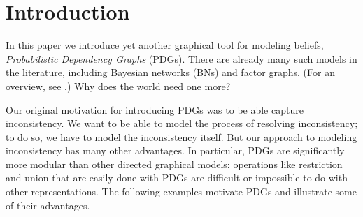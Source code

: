 \documentclass[letterpaper]{article} %
\theoremstyle{plain}
\theoremstyle{definition}
\theoremstyle{remark}
\begin{document}
\section{Introduction}

In this paper we introduce yet another graphical
tool
for modeling beliefs,
\emph{Probabilistic Dependency Graphs} (PDGs). There are already many
such models in the literature, including Bayesian networks (BNs) and
factor graphs. (For an overview, see 
\cite{KF09}.)
Why does the world need one more?  

Our original motivation for introducing PDGs was to be able capture
inconsistency. We want to be able to model the process of resolving
inconsistency; to do so, we have to model the inconsistency itself. But our
approach to modeling inconsistency has many other advantages. In particular,
PDGs are significantly more modular than other directed graphical models:
operations like restriction and union that are easily done with PDGs are
difficult or impossible to do with other representations.
%
The following examples motivate PDGs and illustrate some of
their advantages.
\end{document}
